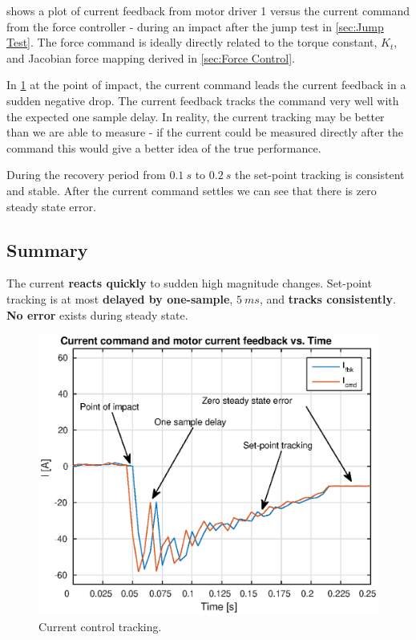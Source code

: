  shows a plot of current feedback from motor driver 1 versus the current command from the force controller - during an impact after the jump test in \cref{sec:Jump Test}. The force command is ideally directly related to the torque constant, $K_t$, and Jacobian force mapping derived in \cref{sec:Force Control}. 

In \cref{fig:Current control tracking} at the point of impact, the current command leads the current feedback in a sudden negative drop. The current feedback tracks the command very well with the expected one sample delay. In reality, the current tracking may be better than we are able to measure - if the current could be measured directly after the command this would give a better idea of the true performance. 

During the recovery period from $0.1\ s$ to $0.2\ s$ the set-point tracking is consistent and stable. After the current command settles we can see that there is zero steady state error.

\subsection{Summary}

The current \textbf{reacts quickly} to sudden high magnitude changes. Set-point tracking is at most \textbf{delayed by one-sample}, $5\ ms$, and \textbf{tracks consistently}. \textbf{No error} exists during steady state. 

\begin{figure}
\centering
\includegraphics[width=1\textwidth]{images/experiments/current-tracking-impact.eps} 
\caption{Current control tracking.}
\label{fig:Current control tracking}
\end{figure}

